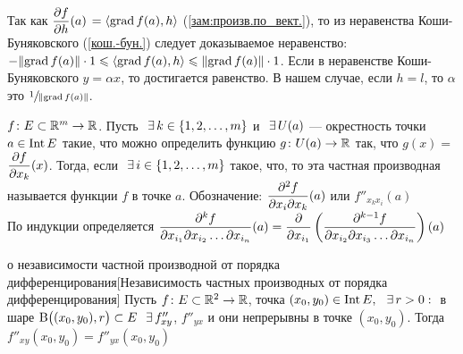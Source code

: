 \begin{prf} %
	Так как {\small$\displaystyle\frac{\partial f}{\partial h}(a)$} $= \left<\mathrm{grad\,} f(a), h\right>$ (\ref{зам:произв.по_вект.}), 
	то из неравенства Коши-Буняковского (\ref{кош.-бун.}) следует доказываемое неравенство: 
	$-\|\mathrm{grad\,} f(a)\| \cdot 1 \leqslant \left<\mathrm{grad\,} f(a), h\right> \leqslant \|\mathrm{grad\,} f(a)\| \cdot 1$.
	Если в неравенстве Коши-Буняковского  $y = \alpha x$, 
	то достигается равенство. В нашем случае, если  
	$h = l$, то $\alpha$ это $\sfrac{1}{\|\mathrm{grad\,} f(a)\|}$.
\end{prf} %


\begin{opr}
	$f\colon E \subset \mathbb R^m \to \mathbb R$. Пусть$\E k \in \{1, 2, \dots, m\}$ и$\E U(a)$ --- окрестность точки $a \in \mathrm{Int}\, E$\linebreak
	такие, что можно определить функцию $g\colon U(a) \to \mathbb R$ так, что $g(x) ={}${\small$\displaystyle\frac{\partial f}{\partial x_k}(x)$}.
	Тогда, если$\E i\in \{1, 2, \dots, m\}$ такое, что, то эта частная производная называется
	функции $f$ в точке $a$.  \smallskip 
	Обозначение: {\small$\displaystyle\frac{\partial ^2f}{\partial x_i\partial x_k}(a)$}
	или $f''_{x_kx_i}(a)$\\
	По индукции определяется {\small$\displaystyle\frac{\partial ^kf}{\partial x_{i_1} \partial x_{i_2} \dots \partial x_{i_n}}(a) =
	\frac{\partial }{\partial x_{i_1}}\left( \frac{\partial ^{k-1}f}{\partial x_{i_2} \partial x_{i_3} \dots \partial x_{i_n}}\right)(a) $}
	
\end{opr}

\begin{teor}[https://www.youtube.com/live/oWtiSJdhQV8?si=YUdpoEusMGWZikUh&t=3917]{о независимости частной производной от порядка дифференцирования}[Независимость частных производных от порядка дифференцирования]
	Пусть $f\colon E \subset \mathbb R^2 \to \mathbb R$, точка $(x_0, y_0) \in \Int E, \E r > 0 :{}$ в шаре $\BB{(x_0, y_0), r} \subset E \E f''_{xy}$, $f''_{yx}$
	и они непрерывны в точке $(x_0, y_0)$. Тогда$f''_{xy}(x_0, y_0) = f''_{yx}(x_0, y_0)$
\end{teor} %


